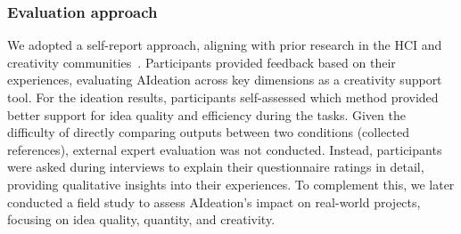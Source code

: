 \subsubsection{Evaluation approach}
We adopted a self-report approach, aligning with prior research in the HCI and creativity communities~\cite{lubos2024llm,satyanarayan2019critical,palani2022don, son2024genquery}. Participants provided feedback based on their experiences, evaluating AIdeation across key dimensions as a creativity support tool. For the ideation results, participants self-assessed which method provided better support for idea quality and efficiency during the tasks. Given the difficulty of directly comparing outputs between two conditions (collected references), external expert evaluation was not conducted. Instead, participants were asked during interviews to explain their questionnaire ratings in detail, providing qualitative insights into their experiences. To complement this, we later conducted a field study to assess AIdeation's impact on real-world projects, focusing on idea quality, quantity, and creativity.







